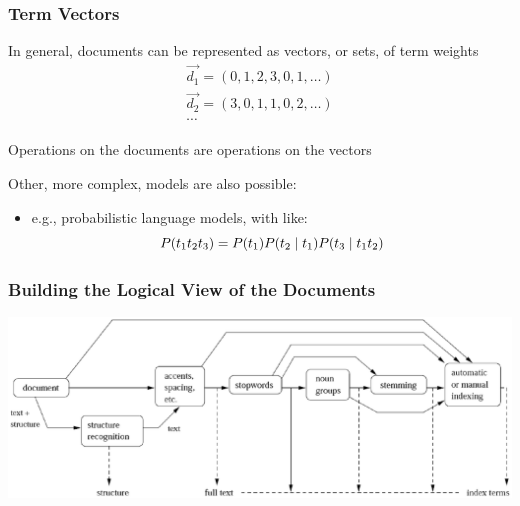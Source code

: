 \documentclass[svgnames]{beamer}
\begin{document}

\begin{frame}
    \frametitle{Term Vectors}

    \begin{block}{}
        In general, documents can be represented as vectors, or sets, of term
        weights
        \begin{displaymath}
            \begin{array}{ll}
              \vec{d_1} = ( 0, 1, 2, 3, 0, 1, \ldots ) \\
              \vec{d_2} = ( 3, 0, 1, 1, 0, 2, \ldots ) \\
              \cdots
            \end{array}
        \end{displaymath}

        Operations on the documents are operations on the vectors
        
    \end{block}

    \begin{block}{}
        Other, more complex, models are also possible:
        \begin{itemize}
        \item e.g., probabilistic language models, with like:
            \begin{displaymath}\footnotesize
                P(t_{1}t_{2}t_{3})=P(t_{1})P(t_{2}\mid t_{1})P(t_{3}\mid t_{1}t_{2})
            \end{displaymath}
        \end{itemize}
    \end{block}


\end{frame}


\begin{frame}
    \frametitle{Building the Logical View of the Documents}

    \begin{block}{}
        \includegraphics[width=\textwidth]{logical}
    \end{block}  
    
\end{frame}
\end{document}
